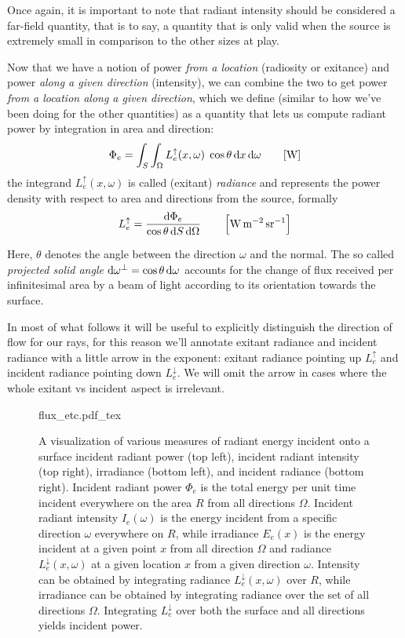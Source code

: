 Once again, it is important to note that radiant intensity should be considered a
\gls{far-field} quantity, that is to say, a quantity that is only valid when
the source is extremely small in comparison to the other sizes at play.

Now that we have a notion of power \textit{from a location} (radiosity or exitance) 
and power \textit{along a given direction} (intensity), we can combine the two to get 
power \textit{from a location along a given direction}, which we define (similar to 
how we've been doing for the other quantities) as a quantity that lets us compute 
radiant power by integration in area and direction:
\begin{equation}
\Phi_e = \int_{S} \int_\Omega L_e^\uparrow(x, \omega) \;\cos\theta\d x\d\omega
\qquad [\unit{\watt}]
\end{equation}
the integrand $L_e^\uparrow(x, \omega)$ is called (exitant) \textsl{\gls{radiance}}
and represents the power density with respect to area and directions from
the source, formally
\begin{equation}
L_e^\uparrow = \frac{\d\Phi_e}{\cos\theta \d S \d\Omega}
\qquad \left[\unit{\watt\per\square\meter\per\steradian}\right]
\end{equation}

Here, $\theta$ denotes the angle between the direction $\omega$ and the normal.
The so called \emph{projected solid angle} $\mathop{}\!\mathrm{d}\omega^\bot = \cos \theta \mathop{}\!\mathrm{d} \omega$
accounts for the change of flux received per infinitesimal area by a beam of light
according to its orientation towards the surface.

In most of what follows it will be useful to explicitly distinguish the direction of
flow for our rays, for this reason we'll annotate \gls{exitant} radiance 
and \gls{incident} radiance with a little arrow in the exponent:
exitant radiance pointing up $L_e^\uparrow$ and incident radiance pointing down
$L_e^\downarrow$. 
We will omit the arrow in cases where the whole exitant vs incident aspect
is irrelevant.


\begin{figure}[tb]
    \centering
    \def\svgwidth{\linewidth}
    {flux_etc.pdf_tex}
    \caption{\label{fig:flux_etc}%
    A visualization of various measures of radiant energy incident onto a surface
    incident radiant power (top left), incident radiant intensity (top right), 
    irradiance (bottom left), and incident radiance (bottom right).
    Incident radiant power $\Phi_e$ is the total energy per unit time incident everywhere 
    on the area $R$ from all directions $\Omega$. 
    Incident radiant intensity $I_e(\omega)$ is the energy incident from a specific 
    direction $\omega$ everywhere on $R$, 
    while irradiance $E_e(x)$ is the energy incident at a given point $x$ from all direction $\Omega$ and
    radiance $L^\downarrow_e(x,\omega)$ at a given location $x$ from a given direction $\omega$.
    Intensity can be obtained by integrating radiance $L^\downarrow_e(x,\omega)$ over $R$, 
    while irradiance can be obtained by integrating radiance over the set of
    all directions $\Omega$. 
    Integrating $L^\downarrow_e$ over both the surface and all directions yields incident power. }
\end{figure}

